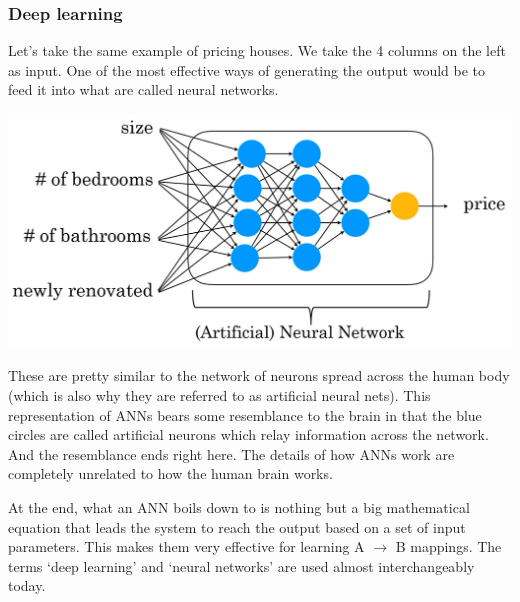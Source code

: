 \documentclass{article}[a4paper,12pt]
\theoremstyle{definition}
\begin{document}
\subsubsection{Deep learning}
Let's take the same example of pricing houses. We take the 4 columns on the left as input. One of the most effective ways of generating the output would be to feed it into what are called neural networks.
\begin{center}\includegraphics[width=\textwidth]{neural_network.png}\end{center}
These are pretty similar to the network of neurons spread across the human body (which is also why they are referred to as artificial neural nets). This representation of ANNs bears some resemblance to the brain in that the blue circles are called artificial neurons which relay information across the network. And the resemblance ends right here. The details of how ANNs work are completely unrelated to how the human brain works. 
\vspace{6pt}

At the end, what an ANN boils down to is nothing but a big mathematical equation that leads the system to reach the output based on a set of input parameters. This makes them very effective for learning A $\rightarrow$ B mappings. The terms `deep learning' and `neural networks' are used almost interchangeably today.
\end{document}
